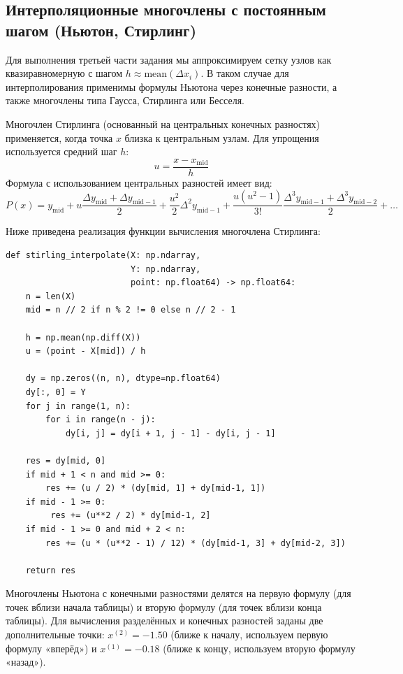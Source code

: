 \subsection{Интерполяционные многочлены с постоянным шагом (Ньютон, Стирлинг)}
Для выполнения третьей части задания мы аппроксимируем сетку узлов как квазиравномерную с шагом $h \approx \text{mean}(\Delta x_i)$. В таком случае для интерполирования применимы формулы Ньютона через конечные разности, а также многочлены типа Гаусса, Стирлинга или Бесселя.

Многочлен Стирлинга (основанный на центральных конечных разностях) применяется, когда точка $x$ близка к центральным узлам. Для упрощения используется средний шаг $h$:
\[
u = \frac{x - x_{\text{mid}}}{h}
\]
Формула с использованием центральных разностей имеет вид:
\[
P(x) = y_{\text{mid}} + u\frac{\Delta y_{\text{mid}} + \Delta y_{\text{mid}-1}}{2} + \frac{u^2}{2}\Delta^2 y_{\text{mid}-1} + \frac{u(u^2-1)}{3!}\frac{\Delta^3 y_{\text{mid}-1} + \Delta^3 y_{\text{mid}-2}}{2} + \dots
\]

Ниже приведена реализация функции вычисления многочлена Стирлинга:
\begin{lstlisting}[style=pythonstyle,caption={Реализация многочлена Стирлинга}]
def stirling_interpolate(X: np.ndarray,
                         Y: np.ndarray,
                         point: np.float64) -> np.float64:
    n = len(X)
    mid = n // 2 if n % 2 != 0 else n // 2 - 1

    h = np.mean(np.diff(X))
    u = (point - X[mid]) / h

    dy = np.zeros((n, n), dtype=np.float64)
    dy[:, 0] = Y
    for j in range(1, n):
        for i in range(n - j):
            dy[i, j] = dy[i + 1, j - 1] - dy[i, j - 1]

    res = dy[mid, 0]
    if mid + 1 < n and mid >= 0:
        res += (u / 2) * (dy[mid, 1] + dy[mid-1, 1])
    if mid - 1 >= 0:
         res += (u**2 / 2) * dy[mid-1, 2]
    if mid - 1 >= 0 and mid + 2 < n:
        res += (u * (u**2 - 1) / 12) * (dy[mid-1, 3] + dy[mid-2, 3])

    return res
\end{lstlisting}

Многочлены Ньютона с конечными разностями делятся на первую формулу (для точек вблизи начала таблицы) и вторую формулу (для точек вблизи конца таблицы).
Для вычисления разделённых и конечных разностей заданы две дополнительные точки: $x^{(2)}=-1.50$ (ближе к началу, используем первую формулу «вперёд») и $x^{(1)}=-0.18$ (ближе к концу, используем вторую формулу «назад»).

